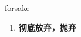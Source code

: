 
\begin{frame}
{\huge forsake}
\begin{center}
\begin{enumerate}\Large
  \item \textbf{彻底放弃，抛弃}
\end{enumerate}
\end{center}
\end{frame}
